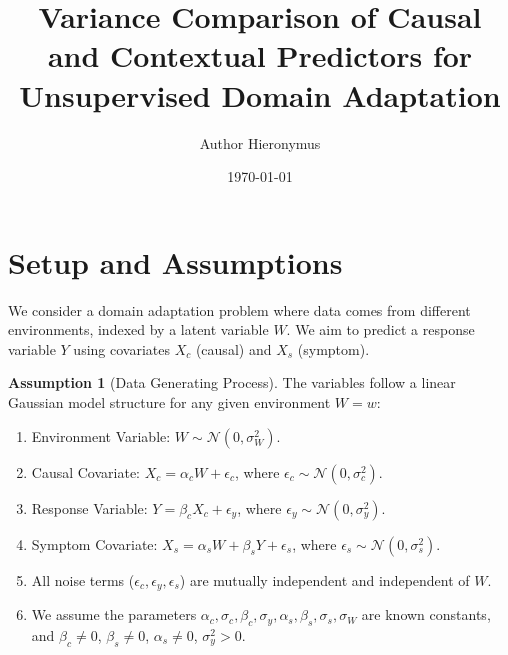 \documentclass{article}
\title{Variance Comparison of Causal and Contextual Predictors for Unsupervised Domain Adaptation}
\author{Author Hieronymus}
\date{\today}
\theoremstyle{definition}
\newtheorem{assumption}[theorem]{Assumption}
\theoremstyle{remark}
\newcommand{\N}{\mathcal{N}} %
\begin{document}
\maketitle

\section{Setup and Assumptions}

We consider a domain adaptation problem where data comes from different environments, indexed by a latent variable $W$. We aim to predict a response variable $Y$ using covariates $X_c$ (causal) and $X_s$ (symptom).

\begin{assumption}[Data Generating Process] \label{ass:dgp}
The variables follow a linear Gaussian model structure for any given environment $W=w$:
\begin{enumerate}
    \item Environment Variable: $W \sim \N(0, \sigma_W^2)$.
    \item Causal Covariate: $X_c = \alpha_c W + \epsilon_c$, where $\epsilon_c \sim \N(0, \sigma_c^2)$.
    \item Response Variable: $Y = \beta_c X_c + \epsilon_y$, where $\epsilon_y \sim \N(0, \sigma_y^2)$.
    \item Symptom Covariate: $X_s = \alpha_s W + \beta_s Y + \epsilon_s$, where $\epsilon_s \sim \N(0, \sigma_s^2)$.
    \item All noise terms ($\epsilon_c, \epsilon_y, \epsilon_s$) are mutually independent and independent of $W$.
    \item We assume the parameters $\alpha_c, \sigma_c, \beta_c, \sigma_y, \alpha_s, \beta_s, \sigma_s, \sigma_W$ are known constants, and $\beta_c \neq 0$, $\beta_s \neq 0$, $\alpha_s \neq 0$, $\sigma_y^2 > 0$.
\end{enumerate}
\end{assumption}
\end{document}
